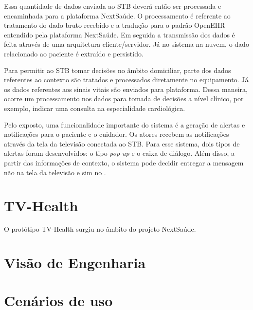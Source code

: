 Essa quantidade de dados enviada ao STB deverá então ser processada e encaminhada
para a plataforma NextSaúde. O processamento é referente ao tratamento do dado
bruto recebido e a tradução para o padrão OpenEHR entendido pela plataforma
NextSaúde. Em seguida a transmissão dos dados é feita através de uma
arquitetura  cliente/servidor. Já no sistema na nuvem, o dado relacionado ao
paciente é extraído e persistido.

Para permitir ao STB tomar decisões no âmbito domiciliar, parte dos dados
referentes ao contexto são tratados e processados diretamente no equipamento.
Já os dados referentes aos sinais vitais são enviados para plataforma. Dessa 
maneira, ocorre um processamento nos dados para tomada de decisões a nível
clínico, por exemplo, indicar uma consulta na especialidade cardiológica.

Pelo exposto, uma funcionalidade importante do sistema é a geração de alertas e
notificações para o paciente e o cuidador. Os atores recebem as notificações
através da tela da televisão conectada ao STB. Para esse sistema, dois tipos de
alertas foram desenvolvidos: o tipo \textit{pop-up} e o caixa de diálogo.
Além disso, a partir das informações de contexto, o sistema pode decidir
entregar a mensagem não na tela da televisão e sim no \smartphone.


\section{TV-Health} \label{sec:tv-health} 

O protótipo TV-Health surgiu no âmbito do projeto NextSaúde. 

\section{Visão de Engenharia} \label{sec:visao-engenharia}

\lipsum[1]

\section{Cenários de uso} \label{sec:cenarios-de-uso}

\lipsum[1]